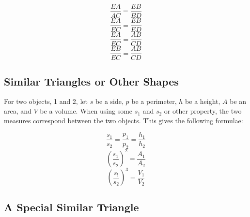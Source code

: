 \documentclass[draft, letterpaper, 12pt]{article}
\begin{document}
		\begin{equation}
			\frac{EA}{AC} = \frac{EB}{BD}
		\end{equation}
		\begin{equation}
			\frac{EA}{EC} = \frac{EB}{ED}
		\end{equation}
		\begin{equation}
			\frac{EA}{EC} = \frac{AB}{CD}
		\end{equation}
		\begin{equation}
			\frac{EB}{EC} = \frac{AB}{CD}
		\end{equation}
	
	\subsection{Similar Triangles or Other Shapes}\label{sec: simple proportions between properties of various similar objects}
		For two objects, 1 and 2, let $s$ be a side, $p$ be a perimeter, $h$ be a height, $A$ be an area, and $V$ be a volume. When using some $s_1$ and $s_2$ or other property, the two measures correspond between the two objects. This gives the following formulae:
		
		\begin{equation}
			\frac{s_1}{s_2} = \frac{p_1}{p_2} = \frac{h_1}{h_2}
		\end{equation}
		\begin{equation}
			\left(\frac{s_1}{s_2}\right)^2 = \frac{A_1}{A_2}
		\end{equation}
		\begin{equation}
			\left(\frac{s_!}{s_2}\right)^3 = \frac{V_1}{V_2}
		\end{equation}
	
	\subsection{A Special Similar Triangle}\label{sec: a common problem about similar triangles}
		
	
\end{document}
